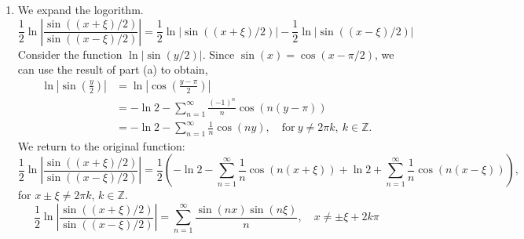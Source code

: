{\begin{Solution}
\begin{enumerate}
\begin{align*}
      \int_0^\pi \ln \left( \cos \frac{x}{2} \right) \,\dd x
      &= \int_0^\pi \left( - \ln 2 
        - \sum_{n = 1}^\infty \frac{ (-1)^n }{ n } \cos(n x) \right) \,\dd x 
      \\
      &= - \pi \ln 2 
      - \sum_{n = 1}^\infty \frac{ (-1)^n }{ n } \int_0^\pi \cos(n x)\,\dd x 
      \\
      &= - \pi \ln 2 - \sum_{n = 1}^\infty \frac{ (-1)^n }{ n } 
      \left[ \frac{\sin(n x)}{n} \right]_0^\pi 
    \end{align*}
    \[
    \boxed{
      \int_0^\pi \ln \left( \cos \left( \frac{x}{2} \right) \right) \,\dd x 
      = - \pi \ln 2
      }
    \]
  \item
    We expand the logorithm.
    \[
    \frac{1}{2} \ln \left| \frac{ \sin((x+\xi)/2) }{ \sin((x-\xi)/2) } \right|
    = \frac{1}{2} \ln \left| \sin((x+\xi)/2) \right| 
    - \frac{1}{2} \ln \left| \sin((x-\xi)/2) \right| 
    \]
    Consider the function $\ln |\sin(y/2)|$.  Since 
    $\sin(x) = \cos(x - \pi / 2)$, we can use the result of part (a) to obtain,
    \begin{align*}
      \ln \left| \sin \left( \frac{y}{2} \right) \right|
      &= \ln \left| \cos \left( \frac{y - \pi}{2} \right) \right| 
      \\
      &= - \ln 2 - \sum_{n = 1}^\infty \frac{ (-1)^n }{ n } \cos( n (y - \pi) ) 
      \\
      &= - \ln 2 - \sum_{n = 1}^\infty \frac{ 1 }{ n } \cos( n y ), \quad
      \mathrm{for}\ y \neq 2 \pi k,\ k \in \mathbb{Z}.
    \end{align*}
    We return to the original function:
    \[
    \frac{1}{2} \ln \left| \frac{ \sin((x+\xi)/2) }{ \sin((x-\xi)/2) } \right|
    = \frac{1}{2} \left( 
      - \ln 2 - \sum_{n = 1}^\infty \frac{ 1 }{ n } \cos( n (x + \xi) )
      + \ln 2 + \sum_{n = 1}^\infty \frac{ 1 }{ n } \cos( n (x - \xi) ) \right), 
    \]
    for $x \pm \xi \neq 2 \pi k$, $k \in \mathbb{Z}$.
    \[
    \boxed{
      \frac{1}{2} \ln \left| \frac{ \sin((x+\xi)/2) }{ \sin((x-\xi)/2) } \right|
      = \sum_{n = 1}^\infty \frac{ \sin(n x) \sin(n \xi) }{ n }, \quad
      x \neq \pm \xi + 2 k \pi
      }
    \]
  \end{enumerate}
\end{Solution}







}
